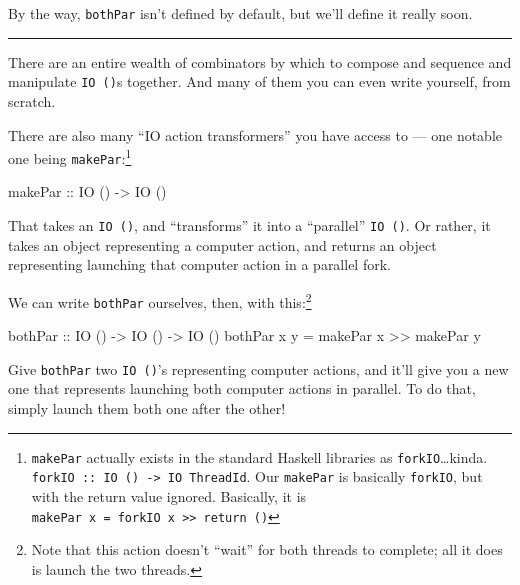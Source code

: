 \documentclass[]{article}
\newenvironment{Shaded}{\begin{snugshade}}{\end{snugshade}}
\newcommand{\DataTypeTok}[1]{\textcolor[rgb]{0.13,0.29,0.53}{#1}}
\newcommand{\FunctionTok}[1]{\textcolor[rgb]{0.00,0.00,0.00}{#1}}
\newcommand{\NormalTok}[1]{#1}
\newcommand{\OtherTok}[1]{\textcolor[rgb]{0.56,0.35,0.01}{#1}}
\begin{document}
By the way, \texttt{bothPar} isn't defined by default, but we'll define it
really soon.

\begin{center}\rule{0.5\linewidth}{\linethickness}\end{center}

There are an entire wealth of combinators by which to compose and sequence and
manipulate \texttt{IO\ ()}s together. And many of them you can even write
yourself, from scratch.

There are also many ``IO action transformers'' you have access to --- one
notable one being \texttt{makePar}:\footnote{\texttt{makePar} actually exists in
  the standard Haskell libraries as \texttt{forkIO}\ldots{}kinda.
  \texttt{forkIO\ ::\ IO\ ()\ -\textgreater{}\ IO\ ThreadId}. Our
  \texttt{makePar} is basically \texttt{forkIO}, but with the return value
  ignored. Basically, it is
  \texttt{makePar\ x\ =\ forkIO\ x\ \textgreater{}\textgreater{}\ return\ ()}}

\begin{Shaded}
\begin{Highlighting}[]
\OtherTok{makePar ::} \DataTypeTok{IO}\NormalTok{ () }\OtherTok{->} \DataTypeTok{IO}\NormalTok{ ()}
\end{Highlighting}
\end{Shaded}

That takes an \texttt{IO\ ()}, and ``transforms'' it into a ``parallel''
\texttt{IO\ ()}. Or rather, it takes an object representing a computer action,
and returns an object representing launching that computer action in a parallel
fork.

We can write \texttt{bothPar} ourselves, then, with this:\footnote{Note that
  this action doesn't ``wait'' for both threads to complete; all it does is
  launch the two threads.}

\begin{Shaded}
\begin{Highlighting}[]
\OtherTok{bothPar ::} \DataTypeTok{IO}\NormalTok{ () }\OtherTok{->} \DataTypeTok{IO}\NormalTok{ () }\OtherTok{->} \DataTypeTok{IO}\NormalTok{ ()}
\NormalTok{bothPar x y }\FunctionTok{=}\NormalTok{ makePar x }\FunctionTok{>>}\NormalTok{ makePar y}
\end{Highlighting}
\end{Shaded}

Give \texttt{bothPar} two \texttt{IO\ ()}'s representing computer actions, and
it'll give you a new one that represents launching both computer actions in
parallel. To do that, simply launch them both one after the other!
\end{document}

